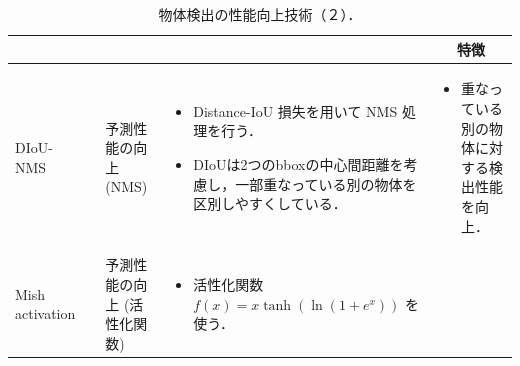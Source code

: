 \documentclass[originalpaper,fleqn]{jsaiart}     %
\begin{document}
\begin{table}
    \caption{物体検出の性能向上技術（２）．}
    \label{tbl-option2}
    \begin{center}
        \setlength{\tabcolsep}{3pt}
        \footnotesize
        \begin{tabularx}{\linewidth}{Xp{1.5cm}Xp{7cm}X} \toprule
            \centering{技術名称} & \centering{文献} & \centering{用途} & \centering{概要} & \multicolumn{1}{c}{特徴} \\ \midrule

            DIoU-NMS
            & \cite{ZWLLYR20} & 予測性能の向上 (NMS) & 
            \begin{itemize}
                \vspace{-0.7\baselineskip}
                \setlength{\leftskip}{-3mm}
                \item Distance-IoU 損失を用いて NMS 処理を行う．
                \item DIoUは2つのbboxの中心間距離を考慮し，一部重なっている別の物体を区別しやすくしている．
            \end{itemize}
            &
            \begin{itemize}
                \vspace{-0.7\baselineskip}
                \setlength{\leftskip}{-3mm}
                \item 重なっている別の物体に対する検出性能を向上．
            \end{itemize}
            \\

            Mish activation
            & \cite{Misra20} & 予測性能の向上 (活性化関数) 
            \vspace{0.7\baselineskip}
            & 
            \begin{itemize}
                \vspace{-0.7\baselineskip}
                \setlength{\leftskip}{-3mm}
                \item 活性化関数 $f(x) = x \tanh(\ln(1 + e^x))$ を使う．
            \end{itemize}
            &
            \\


\end{tabularx}
\end{center}
\end{table}
\end{document}
